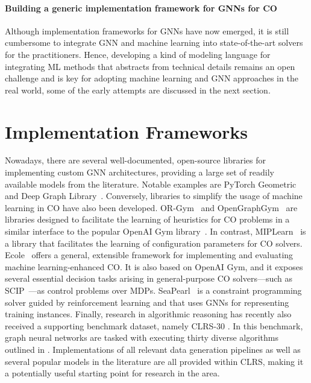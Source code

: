 \documentclass[twoside,11pt]{article}
\newcommand{\cm}[1]{{{\textcolor{orange}{\textbf{[CM:} {#1}\textbf{]}}}}}
\begin{document}
\paragraph{Building a generic implementation framework for GNNs for CO} Although implementation frameworks for GNNs have now emerged, it is still cumbersome to integrate GNN and machine learning into state-of-the-art solvers for the practitioners. Hence, developing a kind of modeling language for integrating ML methods that abstracts from technical details remains an open challenge and is key for adopting machine learning and GNN approaches in the real world, some of the early attempts are discussed in the next section.

\section{Implementation Frameworks}
Nowadays, there are several well-documented, open-source libraries for implementing custom GNN architectures, providing a large set of readily available models from the literature. Notable examples are PyTorch Geometric~\citep{Fey2019} and Deep Graph Library~\citep{wang2019dgl}.
Conversely, libraries to simplify the usage of machine learning in CO have also been developed.
OR-Gym~\citep{software/orgym} and OpenGraphGym~\citep{software/opengraphgym} are libraries designed to facilitate the learning of heuristics for CO problems in a similar interface to the popular OpenAI Gym library~\citep{Bro+2016}. In contrast, MIPLearn~\citep{software/miplearn} is a library that facilitates the learning of configuration parameters for CO solvers.  Ecole~\citep{Pro+2020} offers a general, extensible framework for implementing and evaluating machine learning-enhanced CO. It is also based on OpenAI Gym, and it exposes several essential decision tasks arising in general-purpose CO solvers---such as SCIP~\citep{GamrathEtal2020ZR}---as control problems over MDPs. SeaPearl~\citep{chalumeau2021seapearl} is a constraint programming solver guided by reinforcement learning and that
uses GNNs for representing training instances. Finally, research in algorithmic reasoning has recently also received a supporting benchmark dataset, namely CLRS-30 \citep{velivckovic2022clrs}. In this benchmark, graph neural networks are tasked with executing thirty diverse algorithms outlined in   \citet{cormen2009introduction}. Implementations of all relevant data generation pipelines as well as several popular models in the literature are all provided within CLRS, making it a potentially useful starting point for research in the area.
\end{document}
